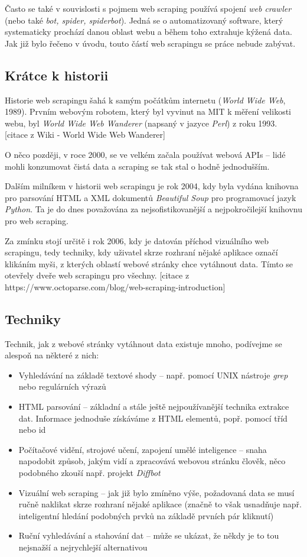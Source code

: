 \documentclass[thesis=B,czech]{FITthesis}[2012/06/26]
\begin{document}
Často se také v souvislosti s pojmem web scraping používá spojení \emph{web crawler} (nebo také \emph{bot, spider, spiderbot}). Jedná se o automatizovaný software, který systematicky prochází danou oblast webu a během toho extrahuje kýžená data. Jak již bylo řečeno v úvodu, touto částí web scrapingu se práce nebude zabývat.

\subsection{Krátce k historii}
Historie web scrapingu šahá k samým počátkům internetu (\emph{World Wide Web}, 1989). Prvním webovým robotem, který byl vyvinut na MIT k měření velikosti webu, byl \emph{World Wide Web Wanderer} (napsaný v jazyce \emph{Perl}) z roku 1993. [citace z Wiki - World Wide Web Wanderer] 

O něco později, v roce 2000, se ve velkém začala používat webová APIs -- lidé mohli konzumovat čistá data a scraping se tak stal o hodně jednodušším. 

Dalším milníkem v historii web scrapingu je rok 2004, kdy byla vydána knihovna pro parsování HTML a XML dokumentů \emph{Beautiful Soup} pro programovací jazyk \emph{Python}. Ta je do dnes považována za nejsofistikovanější a nejpokročilejší knihovnu pro web scraping.

Za zmínku stojí určitě i rok 2006, kdy je datován příchod vizuálního web scrapingu, tedy techniky, kdy uživatel skrze rozhraní nějaké aplikace označí klikáním myši, z kterých oblastí webové stránky chce vytáhnout data. Tímto se otevřely dveře web scrapingu pro všechny. [citace z https://www.octoparse.com/blog/web-scraping-introduction]

\subsection{Techniky}
Technik, jak z webové stránky vytáhnout data existuje mnoho, podívejme se alespo\v{n} na některé z nich:
\begin{itemize}
	\item Vyhledávání na základě textové shody -- např. pomocí UNIX nástroje \emph{grep} nebo regulárních výrazů
	\item HTML parsování -- základní a stále ještě nejpoužívanější technika extrakce dat. Informace jednoduše získáváme z HTML elementů, popř. pomocí tříd nebo id
	\item Počítačové vidění, strojové učení, zapojení umělé inteligence -- snaha napodobit způsob, jakým vidí a zpracovává webovou stránku člověk, něco podobného zkouší např. projekt \emph{Diffbot}
	\item Vizuální web scraping -- jak již bylo zmíněno výše, požadovaná data se musí ručně naklikat skrze rozhraní nějaké aplikace (značně to však usnad\v{n}uje např. inteligentní hledání podobných prvků na základě prvních pár kliknutí)
	\item Ruční vyhledávání a stahování dat -- může se ukázat, že někdy je to tou nejsnažší a nejrychlejší alternativou
\end{itemize}
\end{document}
